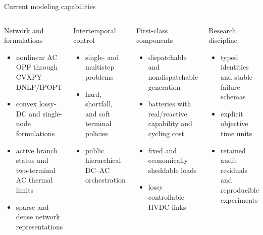\documentclass[aspectratio=169,11pt]{beamer}
\newcommand{\tightitems}{\setlength{\itemsep}{0.42em}}
\begin{document}
\begin{frame}[shrink=5]{Current modeling capabilities}
	\small
	\begin{columns}[T,onlytextwidth]
		\begin{block}{Network and formulations}
			\begin{itemize}\tightitems
				\item nonlinear AC OPF through CVXPY DNLP/IPOPT
				\item convex lossy-DC and single-node formulations
				\item active branch status and two-terminal AC thermal limits
				\item sparse and dense network representations
			\end{itemize}
		\end{block}
		\begin{block}{Intertemporal control}
			\begin{itemize}\tightitems
				\item single- and multistep problems
				\item hard, shortfall, and soft terminal policies
				\item public hierarchical DC--AC orchestration
			\end{itemize}
		\end{block}
		\begin{block}{First-class components}
			\begin{itemize}\tightitems
				\item dispatchable and nondispatchable generation
				\item batteries with real/reactive capability and cycling cost
				\item fixed and economically sheddable loads
				\item lossy controllable HVDC links
			\end{itemize}
		\end{block}
		\begin{block}{Research discipline}
			\begin{itemize}\tightitems
				\item typed identities and stable failure schemas
				\item explicit objective time units
				\item retained audit residuals and reproducible experiments
			\end{itemize}
		\end{block}
	\end{columns}
\end{frame}
\end{document}
